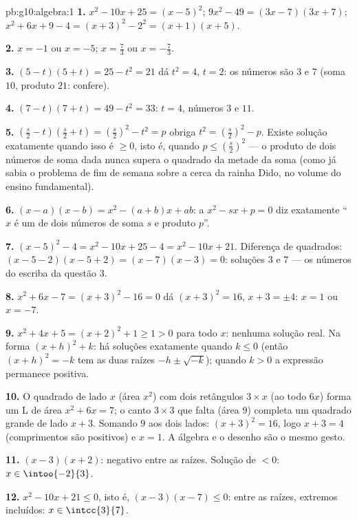 \begin{solution}{pb:g10:algebra:1}
\textbf{1.} $x^2 - 10x + 25 = (x - 5)^2$;
$9x^2 - 49 = (3x - 7)(3x + 7)$;
$x^2 + 6x + 9 - 4 = (x + 3)^2 - 2^2 = (x + 1)(x + 5)$.

\textbf{2.} $x = -1$ ou $x = -5$; \quad $x = \frac73$ ou
$x = -\frac73$.

\textbf{3.} $(5 - t)(5 + t) = 25 - t^2 = 21$ dá $t^2 = 4$,
$t = 2$: os números são $3$ e $7$ (soma $10$, produto $21$:
confere).

\textbf{4.} $(7 - t)(7 + t) = 49 - t^2 = 33$: $t = 4$, números
$3$ e $11$.

\textbf{5.} $\left(\frac s2 - t\right)\left(\frac s2 + t\right)
= \left(\frac s2\right)^2 - t^2 = p$ obriga
$t^2 = \left(\frac s2\right)^2 - p$. Existe solução exatamente
quando isso é $\geq 0$, isto é, quando
$p \leq \left(\frac s2\right)^2$ --- o produto de dois números
de soma dada nunca supera o quadrado da metade da soma (como já
sabia o problema de fim de semana sobre a cerca da rainha Dido,
no volume do ensino fundamental).

\textbf{6.} $(x - a)(x - b) = x^2 - (a + b)x + ab$: a 
$x^2 - sx + p = 0$ diz exatamente ``$x$ é um de dois números de
soma $s$ e produto $p$''.

\textbf{7.} $(x-5)^2 - 4 = x^2 - 10x + 25 - 4 = x^2 - 10x +
21$. Diferença de quadrados:
$(x - 5 - 2)(x - 5 + 2) = (x - 7)(x - 3) = 0$: soluções $3$ e
$7$ --- os números do escriba da questão 3.

\textbf{8.} $x^2 + 6x - 7 = (x + 3)^2 - 16 = 0$ dá
$(x + 3)^2 = 16$, $x + 3 = \pm 4$: $x = 1$ ou $x = -7$.

\textbf{9.} $x^2 + 4x + 5 = (x + 2)^2 + 1 \geq 1 > 0$ para todo
$x$: nenhuma solução real. Na forma $(x + h)^2 + k$: há
soluções exatamente quando $k \leq 0$ (então $(x+h)^2 = -k$ tem
as duas raízes $-h \pm \sqrt{-k}$); quando $k > 0$ a expressão
permanece positiva.

\textbf{10.} O quadrado de lado $x$ (área $x^2$) com dois
retângulos $3 \times x$ (ao todo $6x$) forma um L de área
$x^2 + 6x = 7$; o canto $3 \times 3$ que falta (área $9$)
completa um quadrado grande de lado $x + 3$. Somando $9$ aos
dois lados: $(x + 3)^2 = 16$, logo $x + 3 = 4$ (comprimentos
são positivos) e $x = 1$. A álgebra e o desenho são o mesmo
gesto.

\textbf{11.} $(x-3)(x+2)$: negativo entre as raízes. Solução de
$< 0$: $x \in \intoo{-2}{3}$.

\textbf{12.} $x^2 - 10x + 21 \leq 0$, isto é,
$(x - 3)(x - 7) \leq 0$: entre as raízes, extremos incluídos:
$x \in \intcc{3}{7}$.


\end{solution}
